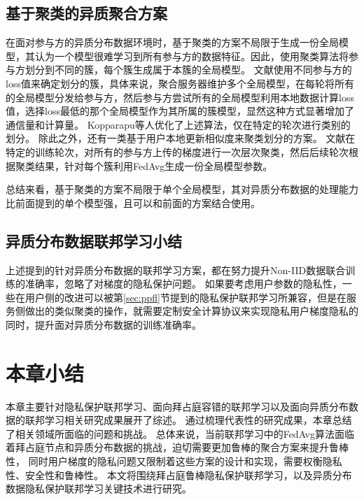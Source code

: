\subsection{基于聚类的异质聚合方案}
在面对参与方的异质分布数据环境时，基于聚类的方案不局限于生成一份全局模型，其认为一个模型很难学习到所有参与方的数据特征。因此，使用聚类算法将参与方划分到不同的簇，每个簇生成属于本簇的全局模型。
文献\cite{ghosh2022efficient}使用不同参与方的loss值来确定划分的簇，具体来说，聚合服务器维护多个全局模型，在每轮将所有的全局模型分发给参与方，然后参与方尝试所有的全局模型利用本地数据计算loss值，选择loss最低的那个全局模型作为其所属的簇模型，显然这种方式显著增加了通信量和计算量。
Kopparapu等人\cite{kopparapu2020fedfmc}优化了上述算法，仅在特定的轮次进行类别的划分。
除此之外，还有一类基于用户本地更新相似度来聚类划分的方案\cite{briggs2020federated, sattler2020clustered, dempster1977maximum}。
文献\cite{briggs2020federated}在特定的训练轮次，对所有的参与方上传的梯度进行一次层次聚类，然后后续轮次根据聚类结果，针对每个簇利用FedAvg生成一份全局模型参数。

总结来看，基于聚类的方案不局限于单个全局模型，其对异质分布数据的处理能力比前面提到的单个模型强，且可以和前面的方案结合使用。

\subsection{异质分布数据联邦学习小结}
上述提到的针对异质分布数据的联邦学习方案，都在努力提升Non-IID数据联合训练的准确率，忽略了对梯度的隐私保护问题。
如果要考虑用户参数的隐私性，一些在用户侧的改进可以被第\ref{sec:ppfl}节提到的隐私保护联邦学习所兼容，但是在服务侧做出的类似聚类的操作，就需要定制安全计算协议来实现隐私用户梯度隐私的同时，提升面对异质分布数据的训练准确率。

\section{本章小结}
本章主要针对隐私保护联邦学习、面向拜占庭容错的联邦学习以及面向异质分布数据的联邦学习相关研究成果展开了综述。
通过梳理代表性的研究成果，本章总结了相关领域所面临的问题和挑战。
总体来说，当前联邦学习中的FedAvg算法面临着拜占庭节点和异质分布数据的挑战，迫切需要更加鲁棒的聚合方案来提升鲁棒性，
同时用户梯度的隐私问题又限制着这些方案的设计和实现，需要权衡隐私性、安全性和鲁棒性。
本文将围绕拜占庭鲁棒隐私保护联邦学习，以及异质分布数据隐私保护联邦学习关键技术进行研究。
